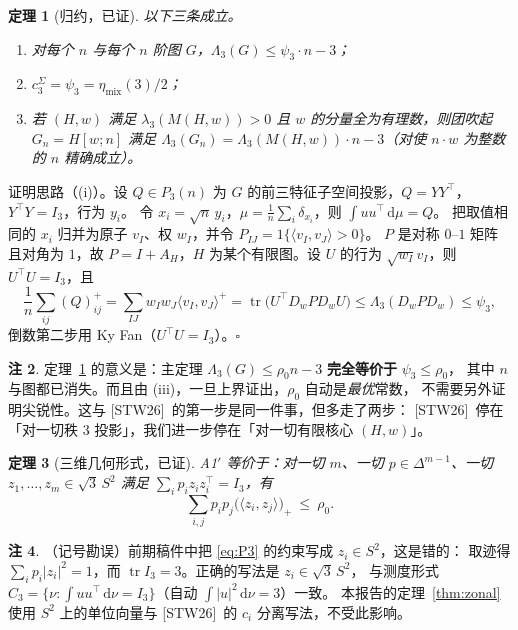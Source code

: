 \documentclass[UTF8,11pt]{ctexart}
\newtheorem{theorem}{定理}[section]
\theoremstyle{definition}
\newtheorem{remark}[theorem]{注}
\newcommand{\Lam}{\Lambda}
\newcommand{\tr}{\operatorname{tr}}
\newcommand{\dd}{\,\mathrm{d}}
\newcommand{\STW}{\textup{[STW26]}}
\begin{document}
\begin{theorem}[归约，已证]\label{thm:reduce}
以下三条成立。
\begin{enumerate}[label=(\roman*),leftmargin=2em]
\item 对每个 $n$ 与每个 $n$ 阶图 $G$，$\Lam_3(G)\le\psi_3\cdot n-3$；
\item $c_3^{\Sigma}=\psi_3=\eta_{\mathrm{mix}}(3)/2$；
\item 若 $(H,w)$ 满足 $\lambda_3(M(H,w))>0$ 且 $w$ 的分量全为有理数，则团吹起 $G_n=H[w;n]$ 满足
$\Lam_3(G_n)=\Lam_3(M(H,w))\cdot n-3$（对使 $n\cdot w$ 为整数的 $n$ 精确成立）。
\end{enumerate}
\end{theorem}

证明思路（(i)）。设 $Q\in P_3(n)$ 为 $G$ 的前三特征子空间投影，$Q=YY^\top$，$Y^\top Y=I_3$，行为 $y_i$。
令 $x_i=\sqrt n\,y_i$，$\mu=\frac1n\sum_i\delta_{x_i}$，则 $\int uu^\top\dd\mu=Q$。
把取值相同的 $x_i$ 归并为原子 $v_I$、权 $w_I$，并令 $P_{IJ}=1\{\langle v_I,v_J\rangle>0\}$。
$P$ 是对称 $0$--$1$ 矩阵且对角为 $1$，故 $P=I+A_H$，$H$ 为某个有限图。设 $U$ 的行为 $\sqrt{w_I}v_I$，则 $U^\top U=I_3$，且
\[
\frac1n\sum_{ij}(Q)_{ij}^{+}=\sum_{IJ}w_Iw_J\langle v_I,v_J\rangle^{+}
=\tr\bigl(U^\top D_wPD_wU\bigr)\le\Lam_3(D_wPD_w)\le\psi_3 ,
\]
倒数第二步用 Ky Fan（$U^\top U=I_3$）。$\square$

\begin{remark}
定理~\ref{thm:reduce} 的意义是：主定理 $\Lam_3(G)\le\rho_0n-3$ \textbf{完全等价于} $\psi_3\le\rho_0$，
其中 $n$ 与图都已消失。而且由 (iii)，一旦上界证出，$\rho_0$ 自动是\emph{最优}常数，
不需要另外证明尖锐性。这与 \STW\ 的第一步是同一件事，但多走了两步：
\STW\ 停在「对一切秩 $3$ 投影」，我们进一步停在「对一切有限核心 $(H,w)$」。
\end{remark}

\begin{theorem}[三维几何形式，已证]\label{thm:P3}
A1$'$ 等价于：对一切 $m$、一切 $p\in\Delta^{m-1}$、一切 $z_1,\dots,z_m\in\sqrt3\,S^2$ 满足
$\sum_ip_iz_iz_i^\top=I_3$，有
\begin{equation}\label{eq:P3}
\tag{P$_3$}\sum_{i,j}p_ip_j\bigl(\langle z_i,z_j\rangle\bigr)_+\ \le\ \rho_0 .
\end{equation}
\end{theorem}

\begin{remark}
（记号勘误）前期稿件中把 \eqref{eq:P3} 的约束写成 $z_i\in S^2$，这是错的：
取迹得 $\sum_ip_i|z_i|^2=1$，而 $\tr I_3=3$。正确的写法是 $z_i\in\sqrt3\,S^2$，
与测度形式 $C_3=\{\nu:\int uu^\top\dd\nu=I_3\}$（自动 $\int|u|^2\dd\nu=3$）一致。
本报告的定理~\ref{thm:zonal} 使用 $S^2$ 上的单位向量与 \STW\ 的 $c_i$ 分离写法，不受此影响。
\end{remark}
\end{document}
